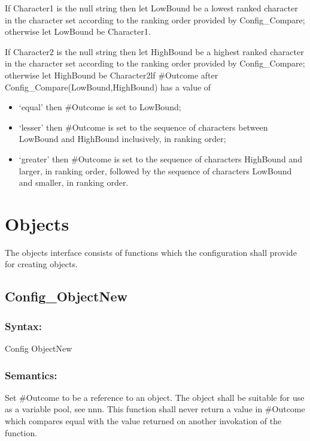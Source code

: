 If Character1 is the null string then let LowBound be a lowest ranked
character in the character set according to the ranking order provided
by Config\_Compare; otherwise let LowBound be Character1.

If Character2 is the null string then let HighBound be a highest ranked
character in the character set according to the ranking order provided
by Config\_Compare; otherwise let HighBound be Character2lf \#Outcome
after Config\_Compare(LowBound,HighBound) has a value of

\begin{itemize}
\item
  `equal' then \#Outcome is set to LowBound;
\item
  `lesser' then \#Outcome is set to the sequence of characters between
  LowBound and HighBound inclusively, in ranking order;
\item
  `greater' then \#Outcome is set to the sequence of characters
  HighBound and larger, in ranking order, followed by the sequence of
  characters LowBound and smaller, in ranking order.
\end{itemize}

\section{Objects}\label{objects}

The objects interface consists of functions which the configuration
shall provide for creating objects.

\subsection{Config\_ObjectNew}\label{config_objectnew}

\subsubsection{Syntax:}\label{syntax-10}

Config ObjectNew

\subsubsection{Semantics:}\label{semantics-11}

Set \#Outcome to be a reference to an object. The object shall be
suitable for use as a variable pool, see nnn. This function shall never
return a value in \#Outcome which compares equal with the value returned
on another invokation of the function.

